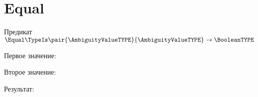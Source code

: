 \section{Equal}
\begin{frame}{Предикат $\Equal\TypeIs\pair{\AmbiguityValueTYPE}{\AmbiguityValueTYPE}\to\BooleanTYPE$}

	Первое значение:


	Второе значение:


	Результат:

\end{frame}
